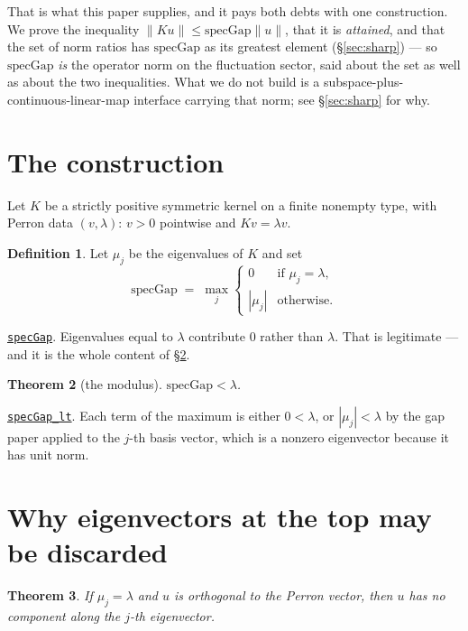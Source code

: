 \documentclass[11pt]{article}
\newtheorem{theorem}{Theorem}[section]
\theoremstyle{definition}
\newtheorem{definition}[theorem]{Definition}
\newcommand{\anchor}{9704b3f3c0d576bb40c43caa5360fbd64dfa1643}
\newcommand{\osline}[3]{%
  \href{https://github.com/lluiseriksson/THE-ERIKSSON-PROGRAMME/blob/\anchor/YangMills/OS/#1.lean\#L#2}{\nolinkurl{#3}}}
\begin{document}
That is what this paper supplies, and it pays both debts with one construction.
We prove the inequality $\|Ku\|\le\mathrm{specGap}\|u\|$, that it is
\emph{attained}, and that the set of norm ratios has $\mathrm{specGap}$ as its
greatest element (§\ref{sec:sharp}) --- so $\mathrm{specGap}$ \emph{is} the
operator norm on the fluctuation sector, said about the set as well as about
the two inequalities.  What we do not build is a subspace-plus-continuous-linear-map
interface carrying that norm; see §\ref{sec:sharp} for why.

\section{The construction}\label{sec:constr}

Let $K$ be a strictly positive symmetric kernel on a finite nonempty type, with
Perron data $(v,\lambda)$: $v > 0$ pointwise and $Kv = \lambda v$.

\begin{definition}\label{def:gap}
Let $\mu_j$ be the eigenvalues of $K$ and set
\[
  \mathrm{specGap} \;=\; \max_j
  \begin{cases}
    0 & \text{if } \mu_j = \lambda,\\
    |\mu_j| & \text{otherwise.}
  \end{cases}
\]
\end{definition}

\osline{SpatialSpectral}{194}{specGap}.
Eigenvalues equal to $\lambda$ contribute $0$ rather than $\lambda$.  That is
legitimate --- and it is the whole content of §\ref{sec:invisible}.

\begin{theorem}[the modulus]\label{thm:gaplt}
$\mathrm{specGap} < \lambda$.
\end{theorem}

\osline{SpatialSpectral}{206}{specGap\_lt}.
Each term of the maximum is either $0 < \lambda$, or $|\mu_j| < \lambda$ by the
gap paper applied to the $j$-th basis vector, which is a nonzero eigenvector
because it has unit norm.

\section{Why eigenvectors at the top may be discarded}\label{sec:invisible}

\begin{theorem}\label{thm:invisible}
If $\mu_j = \lambda$ and $u$ is orthogonal to the Perron vector, then $u$ has no
component along the $j$-th eigenvector.
\end{theorem}
\end{document}
